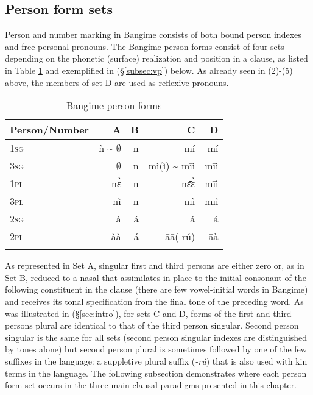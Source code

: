 \documentclass[output=paper]{langscibook}
\begin{document}
\subsection{Person form sets}
\label{subsec:pp}
Person and number marking in Bangime consists of both bound person indexes and free personal pronouns. The Bangime person forms consist of four sets depending on the phonetic (surface) realization and position in a clause, as listed in Table \ref{tab:bpp} and exemplified in (\S \ref{subsec:vp}) below. As already seen in (2)-(5) above, the members of set D are used as reflexive pronouns.
\begin{table}[H]
	\caption{Bangime person forms}
	\label{tab:bpp}
	\begin{tabular}{l rrrr}
		\lsptoprule
		Person/Number & A & B & C & D \\ 
		\midrule
		1\textsc{sg} & ǹ {\textasciitilde} $\emptyset$ & n & mí & mí \\
		3\textsc{sg} & $\emptyset$  & n & mì(ì) {\textasciitilde} mīì & mīì \\	
		\midrule
		1\textsc{pl} & nɛ̀ & n & nɛ̄ɛ̀ & mīì \\
		3\textsc{pl} & nì & n & nīì &   mīì \\
		\midrule 		
		2\textsc{sg} & à & á & á & á \\
		2\textsc{pl} & àà & á & āā(-rú) & āà \\
		\lspbottomrule
	\end{tabular}
\end{table}
As represented in Set A, singular first and third persons are either zero or, as in Set B, reduced to a nasal that assimilates in place to the initial consonant of the following constituent in the clause (there are few vowel-initial words in Bangime) and receives its tonal specification from the final tone of the preceding word. As was illustrated in (\S \ref{sec:intro}), for sets C and D, forms of the first and third persons plural are identical to that of the third person singular. Second person singular is the same for all sets (second person singular indexes are distinguished by tones alone) but second person plural is sometimes followed by one of the few suffixes in the language: a suppletive plural suffix (\textit{-rú}) that is also used with kin terms in the language. The following subsection demonstrates where each person form set occurs in the three main clausal paradigms presented in this chapter.
\end{document}
